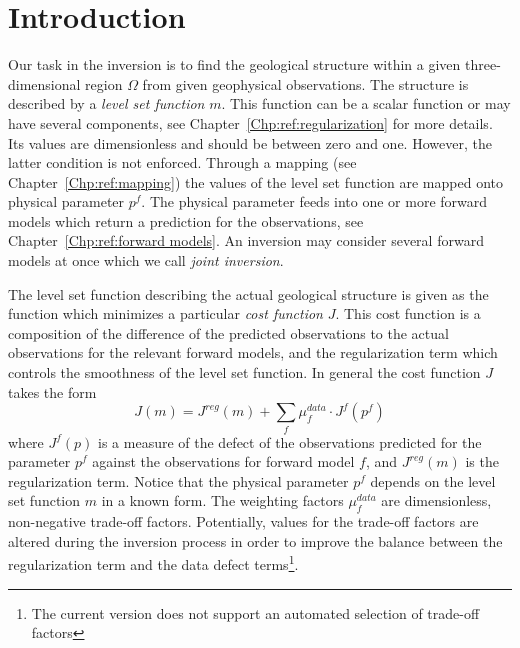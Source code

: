 \chapter{Introduction}\label{Chp:ref:introduction}
Our task in the inversion is to find the geological structure within a given three-dimensional region $\Omega$ from given geophysical 
observations. 
The structure is described by a \emph{level set function} $m$.
This function can be a scalar function or may have several components,
see Chapter~\ref{Chp:ref:regularization} for more details.
Its values are dimensionless and should be between zero and one.
However, the latter condition is not enforced.
Through a mapping (see Chapter~\ref{Chp:ref:mapping}) the values
of the level set function are mapped onto physical parameter $p^f$.
The physical parameter feeds into one or more forward models
which return a prediction for the observations, see Chapter~\ref{Chp:ref:forward models}.
An inversion may consider several forward models at once which we call
\emph{joint inversion}.


The level set function describing the actual geological structure is given as
the function which minimizes a particular \emph{cost function}
$J$.
This cost function is a composition of the difference of the predicted
observations to the actual observations for the relevant forward models, and
the regularization term which controls the smoothness of
the level set function.
In general the cost function $J$ takes the form
\begin{equation}\label{REF:EQU:INTRO 1}
J(m) = J^{reg}(m) + \sum_{f} \mu^{data}_{f} \cdot J^{f}(p^f)
\end{equation} 
where $J^{f}(p)$ is a measure of the defect of the observations predicted for
the parameter $p^f$ against the observations for forward model $f$, and
$J^{reg}(m)$ is the regularization term.
Notice that the physical parameter $p^f$ depends on the level set function
$m$ in a known form.
The weighting factors $\mu^{data}_{f}$ are dimensionless, non-negative
trade-off factors.
Potentially, values for the trade-off factors are altered during the inversion
process in order to improve the balance between the regularization term and
the data defect terms\footnote{The current version does not support an automated selection 
of trade-off factors}.

